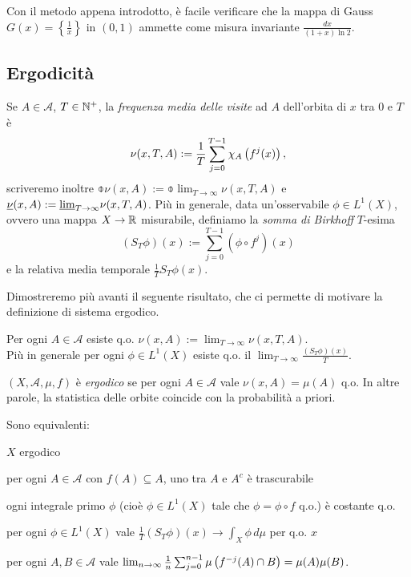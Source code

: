 \begin{esercizio} Con il metodo appena introdotto, è facile verificare che la mappa di Gauss $G(x)=\left\{\frac{1}{x}\right\}$ in $(0,1)$ ammette come misura invariante
 $\frac{dx}{(1+x)\ln 2}$.\end{esercizio}



\subsection{Ergodicità}

\begin{defi} Se $A\in\mathcal{A}$, $T\in\mathbb{N}^+$, la \emph{frequenza media delle visite} ad $A$ dell'orbita di $x$ tra $0$ e $T$ è
\[\nu(x,T,A):=\frac{1}{T}\sum_{j=0}^{T-1}\chi_A\left(f^j(x)\right),\]
scriveremo inoltre $\obar{\nu}(x,A):=\obar{\lim}_{T\to\infty}\nu(x,T,A)$ e $\underline{\nu}(x,A):=\underline{\lim}_{T\to\infty}\nu(x,T,A)$.
Più in generale, data un'osservabile $\phi\in L^1(X)$, ovvero una mappa $X\rightarrow \mathbb{R}$ misurabile, definiamo la \emph{somma di Birkhoff} $T$-esima
\[(S_T\phi)(x):=\sum_{j=0}^{T-1}(\phi\circ f^j)(x)\]
e la relativa media temporale $\frac{1}{T}S_T\phi(x)$.
\end{defi}

Dimostreremo più avanti il seguente risultato, che ci permette di motivare la definizione di sistema ergodico.

\begin{teo}[Birkhoff]Per ogni $A\in\mathcal{A}$ esiste q.o. $\nu(x,A):=\lim_{T\to\infty}\nu(x,T,A)$. \\
Più in generale per ogni $\phi\in L^1(X)$ esiste q.o. il $\lim_{T\to\infty}\frac{(S_T\phi)(x)}{T}$.
\end{teo}

\begin{defi}$(X,\mathcal{A},\mu,f)$ è \emph{ergodico} se per ogni $A\in\mathcal{A}$ vale $\nu(x,A)=\mu(A)$ q.o.
In altre parole, la statistica delle orbite coincide con la probabilità a priori.
\end{defi}

\begin{teo}Sono equivalenti:
\begin{lista}
	\item $X$ ergodico 
	\item per ogni $A\in\mathcal{A}$ con $f(A)\subseteq A$, uno tra $A$ e $A^c$ è trascurabile 
	\item ogni integrale primo $\phi$ (cioè $\phi\in L^1(X)$ tale che $\phi=\phi\circ f$ q.o.) è costante q.o. 
	\item per ogni $\phi\in L^1(X)$ vale $\frac{1}{T}(S_T\phi)(x)\to\int_X \phi\,d\mu$ per q.o. $x$ 
	\item per ogni $A,B\in\mathcal{A}$ vale $\lim_{n\to\infty}\frac{1}{n}\sum_{j=0}^{n-1}\mu\left(f^{-j}(A)\cap B\right)=\mu(A)\mu(B)$. 
\end{lista}
\end{teo}


